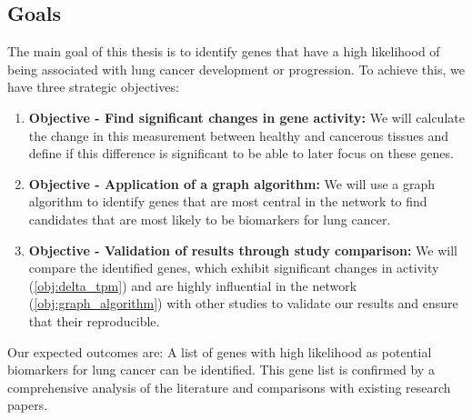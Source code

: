 \subsection{Goals} \label{subsec:goals}

The main goal of this thesis is to identify genes that have a high likelihood
of being associated with lung cancer development or progression.
To achieve this, we have three strategic objectives:
\begin{enumerate}
    \item \textbf{Objective - Find significant changes in gene activity:}
    We will calculate the change in this measurement between healthy and cancerous tissues
    and define if this difference is significant
    to be able to later focus on these genes.
    \label{obj:delta_tpm}

    \item \textbf{Objective - Application of a graph algorithm:}
    We will use a graph algorithm to identify genes that are most central in the network
    to find candidates that are most likely to be biomarkers for lung cancer.
    \label{obj:graph_algorithm}

    \item \textbf{Objective - Validation of results through study comparison:}
    We will compare the identified genes,
    which exhibit significant changes in activity (\ref{obj:delta_tpm})
    and are highly influential in the network (\ref{obj:graph_algorithm}) with other studies
    to validate our results and ensure that their reproducible.
    \label{obj:validation}
\end{enumerate}

{\color{lightgray}
Our expected outcomes are:
A list of genes with high likelihood as potential biomarkers for lung cancer can be identified.
This gene list is confirmed by a comprehensive analysis of the literature and comparisons with existing research papers.
}